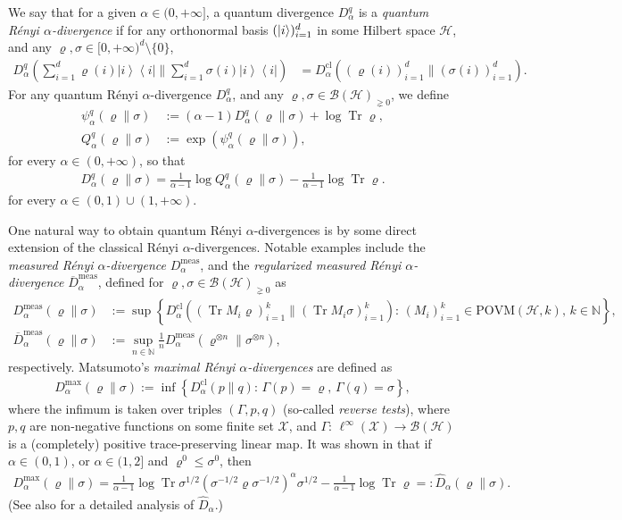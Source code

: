 \documentclass[unsortedaddress,superscriptaddress,pra,notitlepage]{revtex4}
\def\B{{\mathcal B}}
\def\X{{\mathcal X}}
\def\bN{\mathbb{N}}
\def\rho{\varrho}
\def\hil{{\mathcal H}}
\def\bz{\left(}
\def\jz{\right)}
\def\what{\widehat}
\def\oll{\overline}
\def\povm{\mathrm{POVM}}
\def\meas{\mathrm{meas}}
\def\pne{_{\gneq 0}}
\def\cl{\mathrm{cl}}
\def\cl{\mathrm{cl}}
\newcommand{\ki}[1]{\textit{\textit{#1}}}
\newcommand{\ds}{\mbox{ }\mbox{ }}
\newcommand{\diad}[2]{\left|#1\right\rangle\!\left\langle #2\right|}
\newcommand{\pr}[1]{\diad{#1}{#1}}
\DeclareMathOperator{\Tr}{Tr}
\begin{document}
We say that for a given $\alpha\in(0,+\infty]$, a quantum divergence $D_{\alpha}^q$ is a \ki{quantum R\'enyi $\alpha$-divergence}
if for any  orthonormal basis $(\ket{i})_{i=1}^d$ in some Hilbert space $\hil$, and any 
$\rho,\sigma\in[0,+\infty)^d\setminus\{0\}$,
\begin{align}\label{qRenyi def}
D_{\alpha}^q\bz\sum\nolimits_{i=1}^d\rho(i)\pr{i}\Big\|\sum\nolimits_{i=1}^d\sigma(i)\pr{i}\jz
&=
D_{\alpha}^{\cl}\bz(\rho(i))_{i=1}^d\Big\|(\sigma(i))_{i=1}^d\jz.
\end{align}
For any quantum  R\'enyi $\alpha$-divergence $D_{\alpha}^q$, and any 
$\rho,\sigma\in\B(\hil)\pne$, we define
\begin{align*}
\psi_{\alpha}^q(\rho\|\sigma)&:=(\alpha-1)D_{\alpha}^q(\rho\|\sigma)+\log\Tr\rho,\\
Q_{\alpha}^q(\rho\|\sigma)&:=\exp(\psi_{\alpha}^q(\rho\|\sigma)),
\end{align*}
for every $\alpha\in(0,+\infty)$,
so that 
\begin{align*}
D_{\alpha}^q(\rho\|\sigma)=\frac{1}{\alpha-1}\log Q_{\alpha}^q(\rho\|\sigma)
-\frac{1}{\alpha-1}\log\Tr\rho.
\end{align*}
for every $\alpha\in(0,1)\cup(1,+\infty)$.

One natural way to obtain quantum R\'enyi $\alpha$-divergences is 
by some direct extension of the classical R\'enyi $\alpha$-divergences.
Notable 
examples include the \ki{measured R\'enyi $\alpha$-divergence} $D_{\alpha}^{\meas}$, and 
the \ki{regularized measured R\'enyi $\alpha$-divergence} $\oll{D}_{\alpha}^{\meas}$,
defined for $\rho,\sigma\in\B(\hil)\pne$ as
\begin{align}
D_{\alpha}^{\meas}(\rho\|\sigma)&:=
\sup\left\{D_{\alpha}^{\cl}\bz(\Tr M_i\rho)_{i=1}^k\|(\Tr M_i\sigma)_{i=1}^k\jz:\,
(M_i)_{i=1}^k\in\povm(\hil,k),\,k\in\bN
\right\},\label{measured Renyi}\\
\oll{D}_{\alpha}^{\meas}(\rho\|\sigma)&:=\sup_{n\in\bN}\frac{1}{n}
D_{\alpha}^{\meas}(\rho^{\otimes n}\|\sigma^{\otimes n}),
\label{regularized measured Renyi}
\end{align}
respectively.
Matsumoto's \ki{maximal R\'enyi $\alpha$-divergences} \cite{Matsumoto_newfdiv} are defined
as
\begin{align*}
D_{\alpha}^{\max}(\rho\|\sigma):=\inf\left\{D_{\alpha}^{\cl}(p\|q):\,\Gamma(p)=\rho,\,\Gamma(q)=\sigma\right\},
\end{align*}
where the infimum is taken over triples $(\Gamma,p,q)$ (so-called \ki{reverse tests}), where $p,q$ 
are non-negative functions on some finite set $\X$, and $\Gamma:\,\ell^{\infty}(\X)\to\B(\hil)$ is a 
(completely) positive trace-preserving linear map.
It was shown in \cite{Matsumoto_newfdiv}
that if $\alpha\in(0,1)$, or $\alpha\in(1,2]$ and
$\rho^0\le\sigma^0$, then
\begin{align}\label{maxRenyi persp}
D_{\alpha}^{\max}(\rho\|\sigma)=\frac{1}{\alpha-1}\log
\Tr\sigma^{1/2}\bz\sigma^{-1/2}\rho\sigma^{-1/2}\jz^{\alpha}\sigma^{1/2}
-\frac{1}{\alpha-1}\log\Tr\rho
=:\what D_{\alpha}(\rho\|\sigma).
\end{align}
(See also \cite{HiaiMosonyi2017} for a detailed analysis of $\what D_{\alpha}$.)
\end{document}
